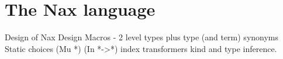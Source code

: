 \section{The Nax language}\label{sec:Nax}
Design of Nax
    Design Macros - 2 level types plus type (and term) synonyms
    Static choices (Mu *)  (In *->*)   index transformers
    kind and type inference.


